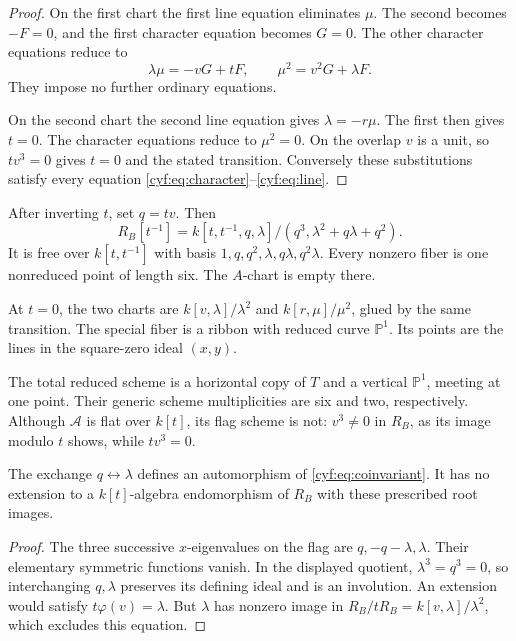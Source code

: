 \begin{proof}
On the first chart the first line equation eliminates
\(\mu\). The second becomes \(-F=0\), and the first
character equation becomes \(G=0\). The other character
equations reduce to
\[
                 \lambda\mu=-vG+tF,\qquad
                 \mu^2=v^2G+\lambda F.
\]
They impose no further ordinary equations.

On the second
chart the second line equation gives \(\lambda=-r\mu\).
The first then gives \(t=0\). The character equations
reduce to \(\mu^2=0\). On the overlap \(v\) is a unit,
so \(tv^3=0\) gives \(t=0\) and the stated transition.
Conversely these substitutions satisfy every equation
\eqref{cyf:eq:character}--\eqref{cyf:eq:line}.
\end{proof}

After inverting \(t\), set \(q=tv\). Then
\begin{equation}\label{cyf:eq:coinvariant}
 R_B[t^{-1}]
 =k[t,t^{-1},q,\lambda]/(q^3,\lambda^2+q\lambda+q^2).
\end{equation}
It is free over \(k[t,t^{-1}]\) with basis
\(1,q,q^2,\lambda,q\lambda,q^2\lambda\).
Every nonzero fiber is one nonreduced point of length six.
The \(A\)-chart is empty there.

At \(t=0\), the two
charts are \(k[v,\lambda]/\lambda^2\) and
\(k[r,\mu]/\mu^2\), glued by the same transition. The
special fiber is a ribbon with reduced curve \(\mathbb P^1\).
Its points are the lines in the square-zero ideal \((x,y)\).

The total reduced scheme is a horizontal copy of \(T\)
and a vertical \(\mathbb P^1\), meeting at one point.
Their generic scheme multiplicities are six and two,
respectively. Although \(\mathcal A\) is flat over
\(k[t]\), its flag scheme is not: \(v^3\ne0\) in
\(R_B\), as its image modulo \(t\) shows, while
\(tv^3=0\).

\begin{proposition}\label{cyf:prop:root-exchange}
The exchange \(q\leftrightarrow\lambda\) defines an
automorphism of \eqref{cyf:eq:coinvariant}. It has no
extension to a \(k[t]\)-algebra endomorphism of \(R_B\)
with these prescribed root images.
\end{proposition}

\begin{proof}
The three successive \(x\)-eigenvalues on the flag are
\(q,-q-\lambda,\lambda\). Their elementary symmetric
functions vanish. In the displayed quotient,
\(\lambda^3=q^3=0\), so interchanging \(q,\lambda\)
preserves its defining ideal and is an involution.
An extension would satisfy \(t\varphi(v)=\lambda\).
But \(\lambda\) has nonzero image in
\(R_B/tR_B=k[v,\lambda]/\lambda^2\), which excludes this
equation.
\end{proof}

